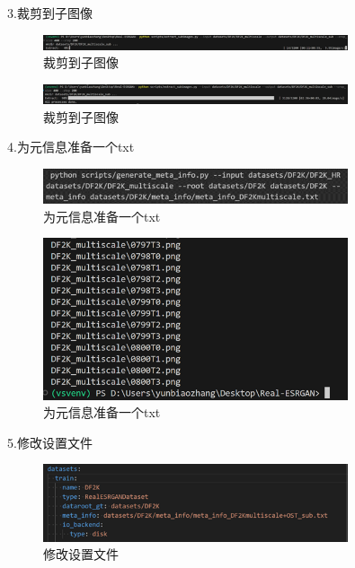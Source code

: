 \documentclass[UTF8,openany]{ctexbook}
\begin{document}
3.裁剪到子图像

\begin{figure}[H]
  \centering
  \includegraphics[width=0.8\textwidth]{img/4.png}
  \caption{裁剪到子图像}
\end{figure}

\begin{figure}[H]
  \centering
  \includegraphics[width=0.8\textwidth]{img/5.png}
  \caption{裁剪到子图像}
\end{figure}

4.为元信息准备一个txt

\begin{figure}[H]
  \centering
  \includegraphics[width=0.8\textwidth]{img/6.png}
  \caption{为元信息准备一个txt}
\end{figure}

\begin{figure}[H]
  \centering
  \includegraphics[width=0.8\textwidth]{img/7.png}
  \caption{为元信息准备一个txt}
\end{figure}

5.修改设置文件

\begin{figure}[H]
  \centering
  \includegraphics[width=0.8\textwidth]{img/8.png}
  \caption{修改设置文件}
\end{figure}
\end{document}
